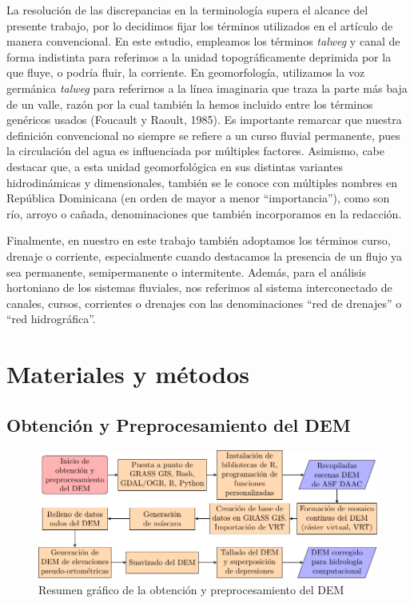 \documentclass[spanish]{article}
\begin{document}
La resolución de las discrepancias en la terminología supera el alcance
del presente trabajo, por lo decidimos fijar los términos utilizados en
el artículo de manera convencional. En este estudio, empleamos los
términos \emph{talweg} y canal de forma indistinta para referimos a la
unidad topográficamente deprimida por la que fluye, o podría fluir, la
corriente. En geomorfología, utilizamos la voz germánica \emph{talweg}
para referirnos a la línea imaginaria que traza la parte más baja de un
valle, razón por la cual también la hemos incluido entre los términos
genéricos usados (Foucault y Raoult, 1985). Es importante remarcar que
nuestra definición convencional no siempre se refiere a un curso fluvial
permanente, pues la circulación del agua es influenciada por múltiples
factores. Asimismo, cabe destacar que, a esta unidad geomorfológica en
sus distintas variantes hidrodinámicas y dimensionales, también se le
conoce con múltiples nombres en República Dominicana (en orden de mayor
a menor ``importancia''), como son río, arroyo o cañada, denominaciones
que también incorporamos en la redacción.

Finalmente, en nuestro en este trabajo también adoptamos los términos
curso, drenaje o corriente, especialmente cuando destacamos la presencia
de un flujo ya sea permanente, semipermanente o intermitente. Además,
para el análisis hortoniano de los sistemas fluviales, nos referimos al
sistema interconectado de canales, cursos, corrientes o drenajes con las
denominaciones ``red de drenajes'' o ``red hidrográfica''.

\hypertarget{materiales-y-muxe9todos}{%
\section{Materiales y métodos}\label{materiales-y-muxe9todos}}

\hypertarget{obtenciuxf3n-y-preprocesamiento-del-dem}{%
\subsection{Obtención y Preprocesamiento del
DEM}\label{obtenciuxf3n-y-preprocesamiento-del-dem}}

\begin{figure}

{\centering \includegraphics[width=0.8\linewidth]{figuras/resumen-obtencion-preprocesamiento-dem} 

}

\caption{Resumen gráfico de la obtención y preprocesamiento del DEM}\label{fig:obtencionpreprocdem}
\end{figure}
\end{document}
